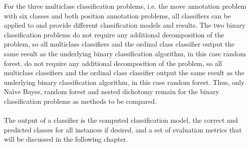 \documentclass[article,type=msc,colorback,accentcolor=tud7b]{tudthesis}
\begin{document}
    For the three multiclass classification problems, i.e. the move annotation problem with six classes and both position annotation problems, all classifiers can be applied to and provide different classification models and results. The two binary classification problems do not require any additional decomposition of the problem, so all multiclass classifiers and the ordinal class classifier output the same result as the underlying binary classification algorithm, in this case random forest. do not require any additional decomposition of the problem, so all multiclass classifiers and the ordinal class classifier output the same result as the underlying binary classification algorithm, in this case random forest. Thus, only Naïve Bayes, random forest and nested dichotomy remain for the binary classification problems as methods to be compared. \\\\
    The output of a classifier is the computed classification model, the correct and predicted classes for all instances if desired, and a set of evaluation metrics that will be discussed in the following chapter.
\end{document}
